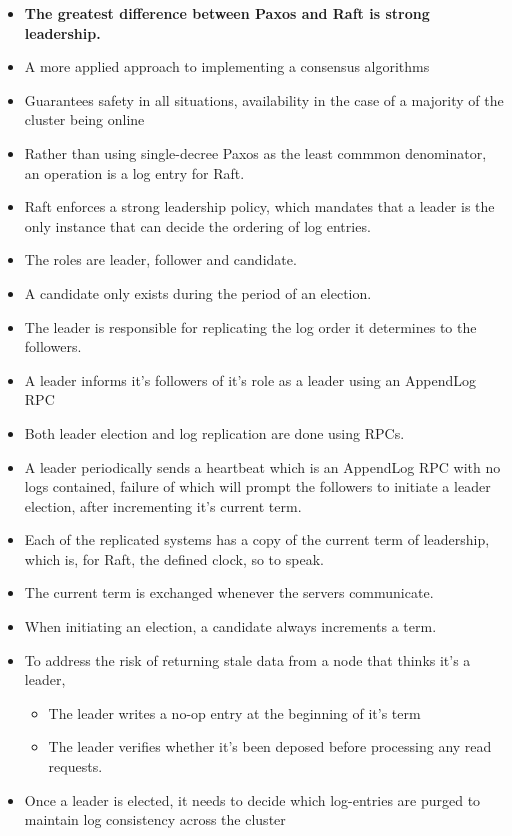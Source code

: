 \documentclass[a4paper]{article}
\begin{document}
\begin{itemize}
\item
    \textbf{The greatest difference between Paxos and Raft is strong
    leadership.}
\item
    A more applied approach to implementing a consensus algorithms
\item
    Guarantees safety in all situations, availability in the case of a
    majority of the cluster being online
\item
    Rather than using single-decree Paxos as the least commmon
    denominator, an operation is a log entry for Raft.
\item
    Raft enforces a strong leadership policy, which mandates that a leader
    is the only instance that can decide the ordering of log entries.
\item
    The roles are leader, follower and candidate.
\item
    A candidate only exists during the period of an election.
\item
    The leader is responsible for replicating the log order it determines
    to the followers.
\item
    A leader informs it's followers of it's role as a leader using an
    AppendLog RPC
\item
    Both leader election and log replication are done using RPCs.
\item
    A leader periodically sends a heartbeat which is an AppendLog RPC with
    no logs contained, failure of which will prompt the followers to
    initiate a leader election, after incrementing it's current term.
\item
    Each of the replicated systems has a copy of the current term of
    leadership, which is, for Raft, the defined clock, so to speak.
\item
    The current term is exchanged whenever the servers communicate.
\item
    When initiating an election, a candidate always increments a term.
\item
    To address the risk of returning stale data from a node that thinks
    it's a leader,

    \begin{itemize}
        \item
        The leader writes a no-op entry at the beginning of it's term
    \item
        The leader verifies whether it's been deposed before processing any
        read requests.
    \end{itemize}
\item
    Once a leader is elected, it needs to decide which log-entries are
    purged to maintain log consistency across the cluster


\end{itemize}
\end{document}
